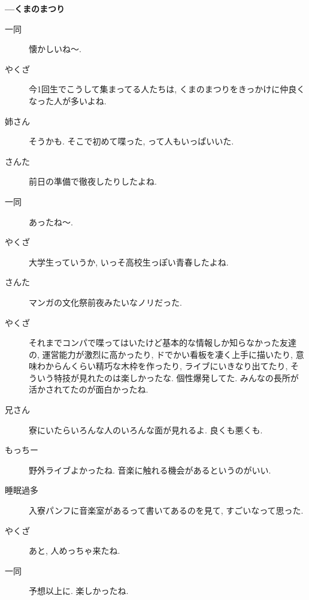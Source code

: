 \documentclass[10pt,b5jsbook,dvips,dvipdfmx,openany]{jsbook}
\theoremstyle{definition}
\begin{document}
\begin{multicols}{2}
		\textbf{---くまのまつり}
		\begin{description}
		\item[ 一同 ]懐かしいね〜.
		\item[やくざ]今1回生でこうして集まってる人たちは, くまのまつりをきっかけに仲良くなった人が多いよね.
		\item[姉さん]そうかも. そこで初めて喋った, って人もいっぱいいた.
		\item[さんた]前日の準備で徹夜したりしたよね.
		\item[ 一同 ]あったね〜.
		\item[やくざ]大学生っていうか, いっそ高校生っぽい青春したよね.
		\item[さんた]マンガの文化祭前夜みたいなノリだった.
		\item[やくざ]それまでコンパで喋ってはいたけど基本的な情報しか知らなかった友達の, 運営能力が激烈に高かったり, ドでかい看板を凄く上手に描いたり, 意味わからんくらい精巧な木枠を作ったり, ライブにいきなり出てたり, そういう特技が見れたのは楽しかったな. 個性爆発してた. みんなの長所が活かされてたのが面白かったね.
		\item[兄さん]寮にいたらいろんな人のいろんな面が見れるよ. 良くも悪くも.
		\item[もっちー]野外ライブよかったね. 音楽に触れる機会があるというのがいい.
		\item[睡眠過多]入寮パンフに音楽室があるって書いてあるのを見て, すごいなって思った.
		\item[やくざ]あと, 人めっちゃ来たね.
		\item[ 一同 ]予想以上に. 楽しかったね.
		\end{description}


\end{multicols}
\end{document}
